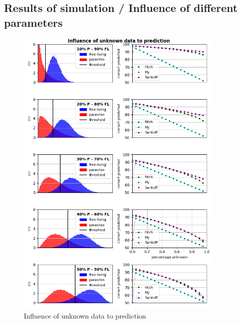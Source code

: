     \subsection{Results of simulation / Influence of different parameters}

    \begin{figure}
      \centering
      \includegraphics[trim = 0mm 0mm 0mm 50mm, clip,width=0.9\textwidth]{Figures/simulation_evaluation_1.png}
      \caption{Influence of unknown data to prediction}
    \end{figure}


